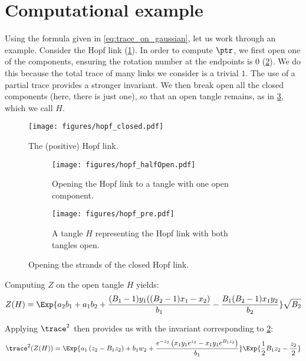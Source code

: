 \section{Computational example}

Using the formula given in \cref{eq:trace_on_gaussian}, let us work through an
example.
Consider the Hopf link (\cref{fig:hopf_closed}). In order to compute $\ptr$, we
first open one of the components, ensuring the rotation number at the endpoints
is $0$ (\cref{fig:hopf_halfOpen}). We do this because the total trace of many
links we consider is a trivial $1$. The use of a partial trace provides a
stronger invariant. We then break open all the closed components (here, there is
just one), so that an open tangle remains, as in \cref{fig:hopf_pre}, which we
call $H$.

\begin{figure}[ht]
        \centering
        \texttt{[image: figures/hopf\_closed.pdf]}
        \caption{The (positive) Hopf link.}
        \label{fig:hopf_closed}
\end{figure}
\begin{figure}[ht]
        \begin{subfigure}[b]{0.5\textwidth}
                \centering
                \texttt{[image: figures/hopf\_halfOpen.pdf]}
                \caption{Opening the Hopf link to a tangle with one open
                component.}
                \label{fig:hopf_halfOpen}
        \end{subfigure}
        \begin{subfigure}[b]{0.5\textwidth}
                \centering
                \texttt{[image: figures/hopf\_pre.pdf]}
                \caption{A tangle $H$ representing the Hopf link with both
                tangles open.}
                \label{fig:hopf_pre}
        \end{subfigure}
        \label{fig:hopf_decompose}
        \caption{Opening the strands of the closed Hopf link.}
\end{figure}

Computing $Z$ on the open tangle $H$ yields:
\begin{equation}
        Z(H) = \Exp{
                a_2 b_1+a_1 b_2+\frac{(B_1-1) y_1
                ((B_2-1) x_1-x_2)}{b_1}-\frac{B_1
                (B_2-1) x_1 y_2}{b_2}
        }
        \sqrt{B_2}
\end{equation}

Applying $\trace^2$ then provides us with the invariant corresponding to
\cref{fig:hopf_halfOpen}:
\begin{equation}
        \trace^{2}(Z(H)) = \Exp{
                a_1 \left(z_2-B_1 z_2\right)+b_1 w_2+\frac{e^{-z_2} \left(x_1
                y_1 e^{z_2}-x_1 y_1 e^{B_{1} z_2}\right)}{b_1}
        }
        \Exp{\frac{1}{2} B_{1} z_2-\frac{z_2}{2}}
\end{equation}

